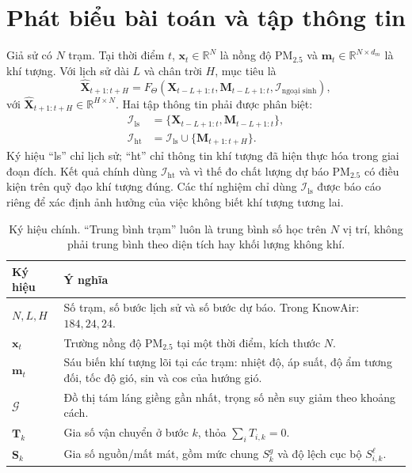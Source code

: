 \documentclass[10pt,a4paper]{article}
\newcommand{\pmfine}{PM$_{2.5}$}
\newcommand{\R}{\mathbb{R}}
\begin{document}
\section{Phát biểu bài toán và tập thông tin}

Giả sử có $N$ trạm. Tại thời điểm $t$, $\bm{x}_{t}\in\R^{N}$ là nồng độ \pmfine{} và $\bm{m}_{t}\in\R^{N\times d_m}$ là khí tượng. Với lịch sử dài $L$ và chân trời $H$, mục tiêu là
\begin{equation}
  \widehat{\bm{X}}_{t+1:t+H}
  = F_{\Theta}\!\left(
      \bm{X}_{t-L+1:t},
      \bm{M}_{t-L+1:t},
      \mathcal{I}_{\text{ngoại sinh}}
    \right),
  \label{eq:problem}
\end{equation}
với $\widehat{\bm{X}}_{t+1:t+H}\in\R^{H\times N}$. Hai tập thông tin phải được phân biệt:
\begin{align}
  \mathcal{I}_{\mathrm{ls}}
  &= \{\bm{X}_{t-L+1:t},\bm{M}_{t-L+1:t}\},
  \label{eq:history-info}\\
  \mathcal{I}_{\mathrm{ht}}
  &= \mathcal{I}_{\mathrm{ls}}\cup\{\bm{M}_{t+1:t+H}\}.
  \label{eq:realized-info}
\end{align}
Ký hiệu ``ls'' chỉ lịch sử; ``ht'' chỉ thông tin khí tượng đã hiện thực hóa trong giai đoạn đích. Kết quả chính dùng $\mathcal{I}_{\mathrm{ht}}$ và vì thế đo chất lượng dự báo \pmfine{} có điều kiện trên quỹ đạo khí tượng đúng. Các thí nghiệm chỉ dùng $\mathcal{I}_{\mathrm{ls}}$ được báo cáo riêng để xác định ảnh hưởng của việc không biết khí tượng tương lai.

\begin{table}[t]
  \centering
  \caption{Ký hiệu chính. ``Trung bình trạm'' luôn là trung bình số học trên $N$ vị trí, không phải trung bình theo diện tích hay khối lượng không khí.}
  \label{tab:notation}
  \begin{tabularx}{\textwidth}{@{}lX@{}}
    \toprule
    Ký hiệu & Ý nghĩa \\
    \midrule
    $N,L,H$ & Số trạm, số bước lịch sử và số bước dự báo. Trong KnowAir: $184,24,24$. \\
    $\bm{x}_{t}$ & Trường nồng độ \pmfine{} tại một thời điểm, kích thước $N$. \\
    $\bm{m}_{t}$ & Sáu biến khí tượng lõi tại các trạm: nhiệt độ, áp suất, độ ẩm tương đối, tốc độ gió, sin và cos của hướng gió. \\
    $\mathcal{G}$ & Đồ thị tám láng giềng gần nhất, trọng số nền suy giảm theo khoảng cách. \\
    $\bm{T}_{k}$ & Gia số vận chuyển ở bước $k$, thỏa $\sum_i T_{i,k}=0$. \\
    $\bm{S}_{k}$ & Gia số nguồn/mất mát, gồm mức chung $S_k^g$ và độ lệch cục bộ $S_{i,k}^{\ell}$. \\
    \bottomrule
  \end{tabularx}
\end{table}
\end{document}

